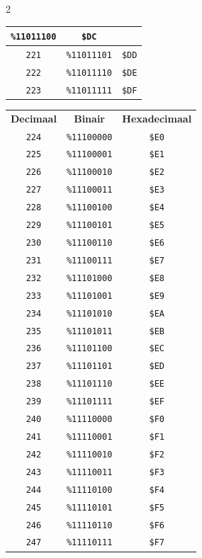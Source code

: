 \begin{multicols}{2}
\begin{center}
\begin{tabular}{|c|c|c|}
\texttt{\%11011100} &  \texttt{\$DC} \\ \hline  \texttt{221} & \texttt{\%11011101} &  \texttt{\$DD} \\ \hline  \texttt{222} & \texttt{\%11011110} &  \texttt{\$DE} \\ \hline  \texttt{223} & \texttt{\%11011111} &  \texttt{\$DF} \\ \hline
\end{tabular}
\end{center}

\begin{center}
 \begin{tabular}{|c|c|c|}
  \hline
		\textbf{Decimaal} & \textbf{Binair} & \textbf{Hexadecimaal} \\ \hhline{|=|=|=|}   	 \texttt{224} & \texttt{\%11100000} &  \texttt{\$E0} \\ \hline \texttt{225} & \texttt{\%11100001} &  \texttt{\$E1} \\ \hline \texttt{226} & \texttt{\%11100010} &  \texttt{\$E2} \\ \hline \texttt{227} & \texttt{\%11100011} &  \texttt{\$E3} \\ \hline \texttt{228} & \texttt{\%11100100} &  \texttt{\$E4} \\ \hline \texttt{229} & \texttt{\%11100101} &  \texttt{\$E5} \\ \hline \texttt{230} & \texttt{\%11100110} &  \texttt{\$E6} \\ \hline \texttt{231} & \texttt{\%11100111} &  \texttt{\$E7} \\ \hline \texttt{232} & \texttt{\%11101000} &  \texttt{\$E8} \\ \hline \texttt{233} & \texttt{\%11101001} &  \texttt{\$E9} \\ \hline \texttt{234} & \texttt{\%11101010} &  \texttt{\$EA} \\ \hline \texttt{235} & \texttt{\%11101011} &  \texttt{\$EB} \\ \hline \texttt{236} & \texttt{\%11101100} &  \texttt{\$EC} \\ \hline \texttt{237} & \texttt{\%11101101} &  \texttt{\$ED} \\ \hline \texttt{238} & \texttt{\%11101110} &  \texttt{\$EE} \\ \hline \texttt{239} & \texttt{\%11101111} &  \texttt{\$EF} \\ \hline \texttt{240} & \texttt{\%11110000} &  \texttt{\$F0} \\ \hline \texttt{241} & \texttt{\%11110001} &  \texttt{\$F1} \\ \hline \texttt{242} & \texttt{\%11110010} &  \texttt{\$F2} \\ \hline \texttt{243} & \texttt{\%11110011} &  \texttt{\$F3} \\ \hline \texttt{244} & \texttt{\%11110100} &  \texttt{\$F4} \\ \hline \texttt{245} & \texttt{\%11110101} &  \texttt{\$F5} \\ \hline \texttt{246} & \texttt{\%11110110} &  \texttt{\$F6} \\ \hline \texttt{247} & \texttt{\%11110111} &  \texttt{\$F7} \\ 
\end{tabular}
\end{center}
\end{multicols}
